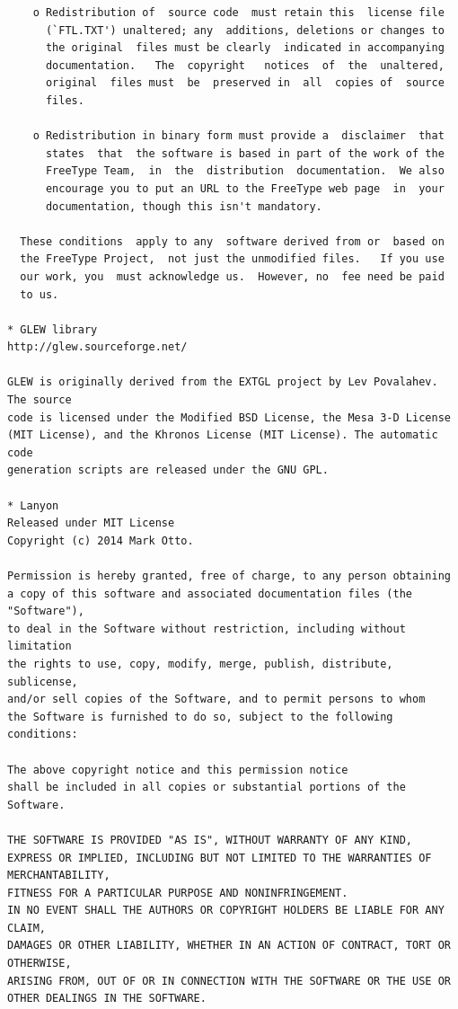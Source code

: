 \documentclass{article}
\begin{document}
\begin{lstlisting}
    o Redistribution of  source code  must retain this  license file
      (`FTL.TXT') unaltered; any  additions, deletions or changes to
      the original  files must be clearly  indicated in accompanying
      documentation.   The  copyright   notices  of  the  unaltered,
      original  files must  be  preserved in  all  copies of  source
      files.

    o Redistribution in binary form must provide a  disclaimer  that
      states  that  the software is based in part of the work of the
      FreeType Team,  in  the  distribution  documentation.  We also
      encourage you to put an URL to the FreeType web page  in  your
      documentation, though this isn't mandatory.

  These conditions  apply to any  software derived from or  based on
  the FreeType Project,  not just the unmodified files.   If you use
  our work, you  must acknowledge us.  However, no  fee need be paid
  to us.

* GLEW library
http://glew.sourceforge.net/

GLEW is originally derived from the EXTGL project by Lev Povalahev. The source
code is licensed under the Modified BSD License, the Mesa 3-D License
(MIT License), and the Khronos License (MIT License). The automatic code
generation scripts are released under the GNU GPL. 

* Lanyon
Released under MIT License
Copyright (c) 2014 Mark Otto.

Permission is hereby granted, free of charge, to any person obtaining
a copy of this software and associated documentation files (the "Software"),
to deal in the Software without restriction, including without limitation
the rights to use, copy, modify, merge, publish, distribute, sublicense,
and/or sell copies of the Software, and to permit persons to whom
the Software is furnished to do so, subject to the following conditions:

The above copyright notice and this permission notice
shall be included in all copies or substantial portions of the Software.

THE SOFTWARE IS PROVIDED "AS IS", WITHOUT WARRANTY OF ANY KIND,
EXPRESS OR IMPLIED, INCLUDING BUT NOT LIMITED TO THE WARRANTIES OF MERCHANTABILITY,
FITNESS FOR A PARTICULAR PURPOSE AND NONINFRINGEMENT.
IN NO EVENT SHALL THE AUTHORS OR COPYRIGHT HOLDERS BE LIABLE FOR ANY CLAIM,
DAMAGES OR OTHER LIABILITY, WHETHER IN AN ACTION OF CONTRACT, TORT OR OTHERWISE,
ARISING FROM, OUT OF OR IN CONNECTION WITH THE SOFTWARE OR THE USE OR OTHER DEALINGS IN THE SOFTWARE.


\end{lstlisting}
\end{document}
